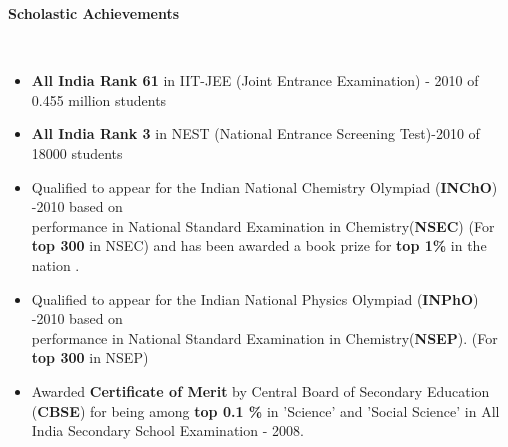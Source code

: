 \documentclass[a4paper,11pt]{article}
\newcommand{\lsep}{-0.5cm}
\newcommand{\resheading}[1]{{\small \colorbox{mygrey}{\begin{minipage}{0.975\textwidth}{\textbf{#1 \vphantom{p\^{E}}}}\end{minipage}}}}
\begin{document}
\resheading{\textbf{\large Scholastic Achievements}}\\[\lsep]
\begin{itemize}
  \item \textbf{All India Rank 61} in IIT-JEE (Joint Entrance Examination) - 2010 of 0.455 million students\\[-0.7cm]
  \item \textbf{All India Rank 3} in NEST (National Entrance Screening Test)-2010 of 18000 students \\[-0.7cm]

  \item Qualified to appear for the Indian National Chemistry Olympiad (\textbf{INChO}) -2010 based on \\performance in National Standard Examination in Chemistry(\textbf{NSEC}) (For \textbf{top 300} in NSEC) and has been awarded a book prize for \textbf{top 1\%} in the nation .\\[-0.7cm]
  \item Qualified to appear for the Indian National Physics Olympiad (\textbf{INPhO}) -2010 based on \\ performance in National Standard Examination in Chemistry(\textbf{NSEP}). (For \textbf{top 300} in NSEP) \\[-0.7cm]
  \item Awarded \textbf{Certificate of Merit} by Central Board of Secondary Education (\textbf{CBSE}) for being among \textbf{top 0.1 \%} in 'Science' and 'Social Science' in All India Secondary School Examination - 2008. \\[-0.7cm]


\end{itemize}
\end{document}
